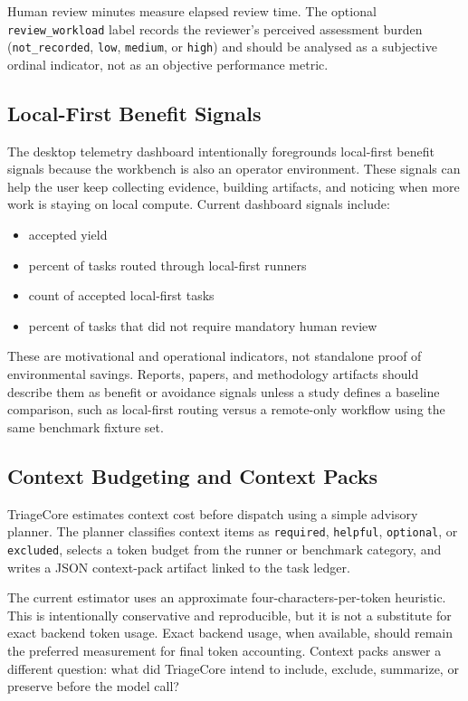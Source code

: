 \documentclass[12pt]{article}
\begin{document}
Human review minutes measure elapsed review time. The optional
\texttt{review\_workload} label records the reviewer's perceived assessment
burden (\texttt{not\_recorded}, \texttt{low}, \texttt{medium}, or
\texttt{high}) and should be analysed as a subjective ordinal indicator, not as
an objective performance metric.

\subsection{Local-First Benefit Signals}

The desktop telemetry dashboard intentionally foregrounds local-first benefit
signals because the workbench is also an operator environment. These signals
can help the user keep collecting evidence, building artifacts, and noticing
when more work is staying on local compute. Current dashboard signals include:
\begin{itemize}
  \item accepted yield
  \item percent of tasks routed through local-first runners
  \item count of accepted local-first tasks
  \item percent of tasks that did not require mandatory human review
\end{itemize}

These are motivational and operational indicators, not standalone proof of
environmental savings. Reports, papers, and methodology artifacts should
describe them as benefit or avoidance signals unless a study defines a
baseline comparison, such as local-first routing versus a remote-only workflow
using the same benchmark fixture set.

\subsection{Context Budgeting and Context Packs}

TriageCore estimates context cost before dispatch using a simple advisory
planner. The planner classifies context items as \texttt{required},
\texttt{helpful}, \texttt{optional}, or \texttt{excluded}, selects a token
budget from the runner or benchmark category, and writes a JSON context-pack
artifact linked to the task ledger.

The current estimator uses an approximate four-characters-per-token heuristic.
This is intentionally conservative and reproducible, but it is not a substitute
for exact backend token usage. Exact backend usage, when available, should
remain the preferred measurement for final token accounting. Context packs
answer a different question: what did TriageCore intend to include, exclude,
summarize, or preserve before the model call?
\end{document}
